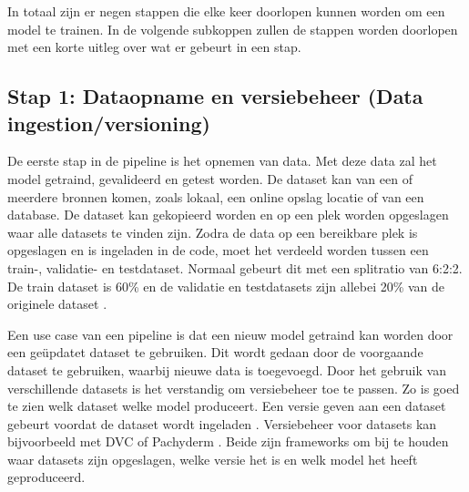 In totaal zijn er negen stappen die elke keer doorlopen kunnen worden om een model te trainen. In de volgende subkoppen zullen de stappen worden doorlopen met een korte uitleg over wat er gebeurt in een stap. 

\subsection{Stap 1: Dataopname en versiebeheer (Data ingestion/versioning)}\label{subsec:ch4-data-opname-en-versiebeheer}
De eerste stap in de pipeline is het opnemen van data. Met deze data zal het model getraind, gevalideerd en getest worden. De dataset kan van een of meerdere bronnen komen, zoals lokaal, een online opslag locatie of van een database. De dataset kan gekopieerd worden en op een plek worden opgeslagen waar alle datasets te vinden zijn. Zodra de data op een bereikbare plek is opgeslagen en is ingeladen in de code, moet het verdeeld worden tussen een train-, validatie- en testdataset. Normaal gebeurt dit met een splitratio van 6:2:2. De train dataset is 60\% en de validatie en testdatasets zijn allebei 20\% van de originele dataset \cite[p.~27-37]{building-machine-learning-pipelines-oreilly}.

Een use case van een pipeline is dat een nieuw model getraind kan worden door een geüpdatet dataset te gebruiken. Dit wordt gedaan door de voorgaande dataset te gebruiken, waarbij nieuwe data is toegevoegd. Door het gebruik van verschillende datasets is het verstandig om versiebeheer toe te passen. Zo is goed te zien welk dataset welke model produceert. Een versie geven aan een dataset gebeurt voordat de dataset wordt ingeladen \cite[p.~39-40]{building-machine-learning-pipelines-oreilly}. Versiebeheer voor datasets kan bijvoorbeeld met DVC \cite{dvc} of Pachyderm \cite{pachyderm}. Beide zijn frameworks om bij te houden waar datasets zijn opgeslagen, welke versie het is en welk model het heeft geproduceerd.



